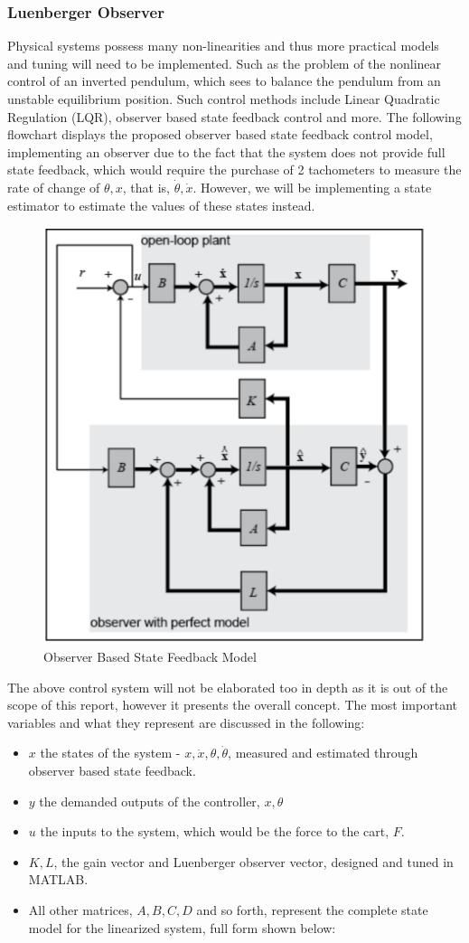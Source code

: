 \documentclass[12pt]{article}
\begin{document}
\subsubsection{Luenberger Observer}
Physical systems possess many non-linearities and thus more practical models and tuning will need to be implemented. Such as the problem of the nonlinear control of an inverted pendulum, which sees to balance the pendulum from an unstable equilibrium position. Such control methods include Linear Quadratic Regulation (LQR), observer based state feedback control and more. The following flowchart displays the proposed observer based state feedback control model, implementing an observer due to the fact that the system does not provide full state feedback, which would require the purchase of 2 tachometers to measure the rate of change of $\theta, x$, that is, $\dot{\theta}, \dot{x}$. However, we will be implementing a state estimator to estimate the values of these states instead.
\begin{figure}[H]
    \centering
    \includegraphics[width=.5\linewidth]{figures/flow.png}
    \caption{Observer Based State Feedback Model \cite{inv2}}
    \label{fig:fc}
\end{figure}
The above control system will not be elaborated too in depth as it is out of the scope of this report, however it presents the overall concept. The most important variables and what they represent are discussed in the following:
\begin{itemize}
    \item $x$ the states of the system - $x, \dot{x}, \theta, \dot{\theta}$, measured and estimated through observer based state feedback.
    \item $y$ the demanded outputs of the controller, $x, \theta$
    \item $u$ the inputs to the system, which would be the force to the cart, $F$.
    \item $K, L$, the gain vector and Luenberger observer vector, designed and tuned in MATLAB.
    \item All other matrices, $A, B, C, D$ and so forth, represent the complete state model for the linearized system, full form shown below:
\end{itemize}
\end{document}
